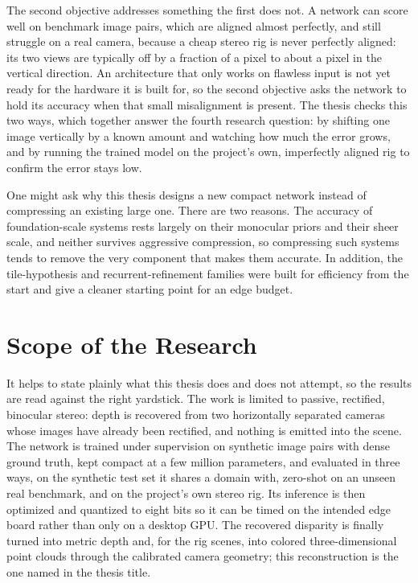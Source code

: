 The second objective addresses something the first does not. A network
can score well on benchmark image pairs, which are aligned almost
perfectly, and still struggle on a real camera, because a cheap stereo
rig is never perfectly aligned: its two views are typically off by a
fraction of a pixel to about a pixel in the vertical direction. An
architecture that only works on flawless input is not yet ready for the
hardware it is built for, so the second objective asks the network to
hold its accuracy when that small misalignment is present. The thesis
checks this two ways, which together answer the fourth research
question: by shifting one image vertically by a known amount and
watching how much the error grows, and by running the trained model on
the project's own, imperfectly aligned rig to confirm the error stays
low.

One might ask why this thesis designs a new compact network instead of
compressing an existing large one. There are two reasons. The accuracy of
foundation-scale systems rests largely on their monocular priors and
their sheer scale, and neither survives aggressive compression, so
compressing such systems tends to remove the very component that makes
them accurate. In addition, the tile-hypothesis and recurrent-refinement
families were built for efficiency from the start and give a cleaner
starting point for an edge budget.

\FloatBarrier
\section{Scope of the Research}
\label{sec:scope}
It helps to state plainly what this thesis does and does not attempt, so
the results are read against the right yardstick. The work is limited to
passive, rectified, binocular stereo: depth is recovered from two
horizontally separated cameras whose images have already been rectified,
and nothing is emitted into the scene. The network is trained under
supervision on synthetic image pairs with dense ground truth, kept
compact at a few million parameters, and evaluated in three ways, on the
synthetic test set it shares a domain with, zero-shot on an unseen real
benchmark, and on the project's own stereo rig. Its inference is then
optimized and quantized to eight bits so it can be timed on the intended
edge board rather than only on a desktop GPU. The recovered disparity is
finally turned into metric depth and, for the rig scenes, into colored
three-dimensional point clouds through the calibrated camera geometry;
this reconstruction is the one named in the thesis title.

